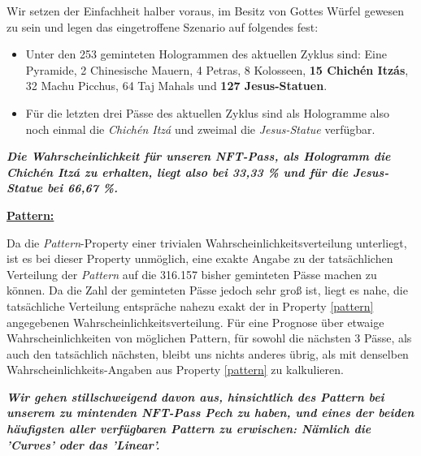 Wir setzen der Einfachheit halber voraus, im Besitz von Gottes Würfel gewesen zu sein und legen das eingetroffene Szenario auf folgendes fest:

\begin{itemize}
  \item Unter den 253 geminteten Hologrammen des aktuellen Zyklus sind: Eine Pyramide, 2 Chinesische Mauern, 4 Petras, 8 Kolosseen, \textbf{15 Chichén Itzás}, 32 Machu Picchus, 64 Taj Mahals und \textbf{127 Jesus-Statuen}.
  \item Für die letzten drei Pässe des aktuellen Zyklus sind als Hologramme also noch einmal die \textit{Chichén Itzá} und zweimal die \textit{Jesus-Statue} verfügbar.
\end{itemize}

\vspace{0.3cm}

\textbf{\textit{Die Wahrscheinlichkeit für unseren NFT-Pass, als Hologramm die Chichén Itzá zu erhalten, liegt also bei 33,33 \% und für die Jesus-Statue bei 66,67 \%.}}


\vspace{1.0cm}


\underline{\textbf{Pattern:}}

\vspace{0.2cm}

Da die \textit{Pattern}-Property einer trivialen Wahrscheinlichkeitsverteilung unterliegt, ist es bei dieser Property unmöglich, eine exakte Angabe zu der tatsächlichen Verteilung der \textit{Pattern} auf die 316.157 bisher geminteten Pässe machen zu können. Da die Zahl der geminteten Pässe jedoch sehr groß ist, liegt es nahe, die tatsächliche Verteilung entspräche nahezu exakt der in Property \ref{pattern} angegebenen Wahrscheinlichkeitsverteilung. Für eine Prognose über etwaige Wahrscheinlichkeiten von möglichen Pattern, für sowohl die nächsten 3 Pässe, als auch den tatsächlich nächsten, bleibt uns nichts anderes übrig, als mit denselben Wahrscheinlichkeits-Angaben aus Property \ref{pattern} zu kalkulieren.

\vspace{0.2cm}

\textbf{\textit{Wir gehen stillschweigend davon aus, hinsichtlich des Pattern bei unserem zu mintenden NFT-Pass Pech zu haben, und eines der beiden häufigsten aller verfügbaren Pattern zu erwischen: Nämlich die 'Curves' oder das 'Linear'.}}


\vspace{1.0cm}


